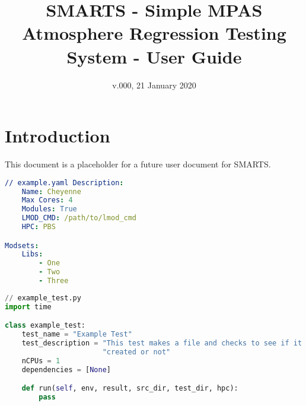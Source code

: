 \documentclass[11pt]{report}
\title{SMARTS - Simple MPAS Atmosphere Regression Testing System - User Guide}
\date{v.000, 21 January 2020}
\begin{document}
\begin{titlepage}
\maketitle
\end{titlepage}


\tableofcontents


\chapter{Introduction}
\label{chap:intro}

This document is a placeholder for a future user document for SMARTS.

\begin{lstlisting}[language=yaml,
                   caption={YAML Example Code Listing},
                   label=yaml_exmaple]
// example.yaml Description:
    Name: Cheyenne
    Max Cores: 4
    Modules: True
    LMOD_CMD: /path/to/lmod_cmd
    HPC: PBS

Modsets:
    Libs:
        - One
        - Two
        - Three
\end{lstlisting}

\begin{lstlisting}[language=Python,
                   caption={Example Python Listing},
                   label=python_example]
// example_test.py
import time

class example_test:
    test_name = "Example Test"
    test_description = "This test makes a file and checks to see if it was" \
                       "created or not"
    nCPUs = 1
    dependencies = [None]

    def run(self, env, result, src_dir, test_dir, hpc):
        pass
\end{lstlisting}









\appendix




\end{document}

